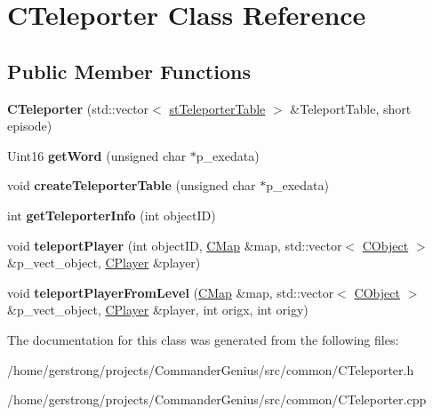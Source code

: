 \hypertarget{class_c_teleporter}{
\section{CTeleporter Class Reference}
\label{class_c_teleporter}
}
\subsection*{Public Member Functions}
\begin{DoxyCompactItemize}
\item 
\hypertarget{class_c_teleporter_ad13b122b3b7abcee2781bc439faad173}{
{\bfseries CTeleporter} (std::vector$<$ \hyperlink{structst_teleporter_table}{stTeleporterTable} $>$ \&TeleportTable, short episode)}
\label{class_c_teleporter_ad13b122b3b7abcee2781bc439faad173}

\item 
\hypertarget{class_c_teleporter_a13c8046b65604714b43d00d8a62492a2}{
Uint16 {\bfseries getWord} (unsigned char $\ast$p\_\-exedata)}
\label{class_c_teleporter_a13c8046b65604714b43d00d8a62492a2}

\item 
\hypertarget{class_c_teleporter_a9b14fbf51d5bad3b778c8fd1f342d491}{
void {\bfseries createTeleporterTable} (unsigned char $\ast$p\_\-exedata)}
\label{class_c_teleporter_a9b14fbf51d5bad3b778c8fd1f342d491}

\item 
\hypertarget{class_c_teleporter_a5fbe0708831091e53b42f1d02b56e6ac}{
int {\bfseries getTeleporterInfo} (int objectID)}
\label{class_c_teleporter_a5fbe0708831091e53b42f1d02b56e6ac}

\item 
\hypertarget{class_c_teleporter_ac4c4e3d597df45485eab988fb9e1fc35}{
void {\bfseries teleportPlayer} (int objectID, \hyperlink{class_c_map}{CMap} \&map, std::vector$<$ \hyperlink{class_c_object}{CObject} $>$ \&p\_\-vect\_\-object, \hyperlink{class_c_player}{CPlayer} \&player)}
\label{class_c_teleporter_ac4c4e3d597df45485eab988fb9e1fc35}

\item 
\hypertarget{class_c_teleporter_a90bcbf4eaeab9e668af594846366a3d4}{
void {\bfseries teleportPlayerFromLevel} (\hyperlink{class_c_map}{CMap} \&map, std::vector$<$ \hyperlink{class_c_object}{CObject} $>$ \&p\_\-vect\_\-object, \hyperlink{class_c_player}{CPlayer} \&player, int origx, int origy)}
\label{class_c_teleporter_a90bcbf4eaeab9e668af594846366a3d4}

\end{DoxyCompactItemize}


The documentation for this class was generated from the following files:\begin{DoxyCompactItemize}
\item 
/home/gerstrong/projects/CommanderGenius/src/common/CTeleporter.h\item 
/home/gerstrong/projects/CommanderGenius/src/common/CTeleporter.cpp\end{DoxyCompactItemize}
